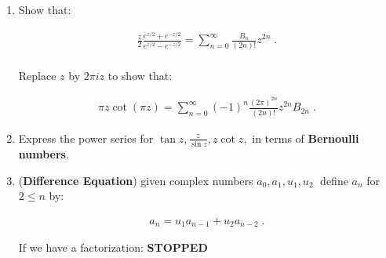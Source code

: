 \begin{enumerate}
\begin{enumerate}
    \end{enumerate}
    
    \item Show that:
  
    \begin{align*}
      \frac{z}{2} \frac{e^{z/2} + e^{-z/2}}{e^{z/2} - e^{-z/2}} = \sum_{n = 0}^\infty \frac{B_n}{(2n)!}z^{2n} \;. \\
    \end{align*}
  
    Replace $z$ by $2\pi i z$ to show that:
  
    \begin{align*}
      \pi z \cot(\pi z) = \sum_{n = 0}^\infty (-1)^n \frac{(2\pi)^{2n}}{(2n)!} z^{2n} B_{2n} \;.
    \end{align*}
  
    \item Express the power series for $\tan z , \frac{z}{\sin z}, z \cot z ,$ in terms of \textbf{Bernoulli numbers}.
  
    \item (\textbf{Difference Equation}) given complex numbers $a_0, a_1, u_1, u_2 \;$ define $a_n$ for $2 \leq n$ by:
  
    \begin{align*}
      a_n = u_1 a_{n - 1} +u_2 a_{n - 2} \;.
    \end{align*}
  
    If we have a factorization: \textbf{STOPPED}
  \end{enumerate}